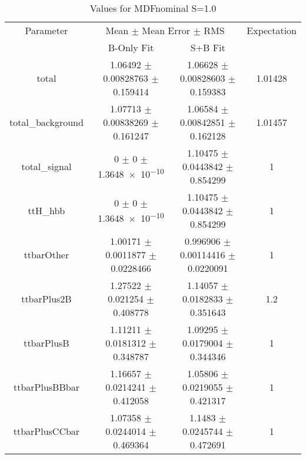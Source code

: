 \begin{table}
\centering
\caption{Values for MDFnominal S=1.0}
\begin{tabular}{cccc}
\toprule
Parameter & \multicolumn{2}{c}{Mean $\pm$ Mean Error $\pm$ RMS} & Expectation\\
 & B-Only Fit & S+B Fit & \\
\midrule
total & \num{1.06492} $\pm$ \num{0.00828763} $\pm$ \num{0.159414} & \num{1.06628} $\pm$ \num{0.00828603} $\pm$ \num{0.159383} & \num{1.01428}\\
total\_background & \num{1.07713} $\pm$ \num{0.00838269} $\pm$ \num{0.161247} & \num{1.06584} $\pm$ \num{0.00842851} $\pm$ \num{0.162128} & \num{1.01457}\\
total\_signal & \num{0} $\pm$ \num{0} $\pm$ \num{1.3648e-10} & \num{1.10475} $\pm$ \num{0.0443842} $\pm$ \num{0.854299} & \num{1}\\
ttH\_hbb & \num{0} $\pm$ \num{0} $\pm$ \num{1.3648e-10} & \num{1.10475} $\pm$ \num{0.0443842} $\pm$ \num{0.854299} & \num{1}\\
ttbarOther & \num{1.00171} $\pm$ \num{0.0011877} $\pm$ \num{0.0228466} & \num{0.996906} $\pm$ \num{0.00114416} $\pm$ \num{0.0220091} & \num{1}\\
ttbarPlus2B & \num{1.27522} $\pm$ \num{0.021254} $\pm$ \num{0.408778} & \num{1.14057} $\pm$ \num{0.0182833} $\pm$ \num{0.351643} & \num{1.2}\\
ttbarPlusB & \num{1.11211} $\pm$ \num{0.0181312} $\pm$ \num{0.348787} & \num{1.09295} $\pm$ \num{0.0179004} $\pm$ \num{0.344346} & \num{1}\\
ttbarPlusBBbar & \num{1.16657} $\pm$ \num{0.0214241} $\pm$ \num{0.412058} & \num{1.05806} $\pm$ \num{0.0219055} $\pm$ \num{0.421317} & \num{1}\\
ttbarPlusCCbar & \num{1.07358} $\pm$ \num{0.0244014} $\pm$ \num{0.469364} & \num{1.1483} $\pm$ \num{0.0245744} $\pm$ \num{0.472691} & \num{1}\\
\bottomrule
\end{tabular}
\end{table}